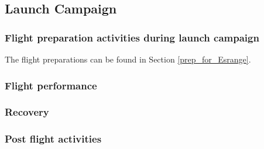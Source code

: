 \pagebreak
\subsection{Launch Campaign}
\subsubsection{Flight preparation activities during launch campaign} %
The flight preparations can be found in Section \ref{prep_for_Esrange}.

\subsubsection{Flight performance}

\subsubsection{Recovery}

\subsubsection{Post flight activities}
